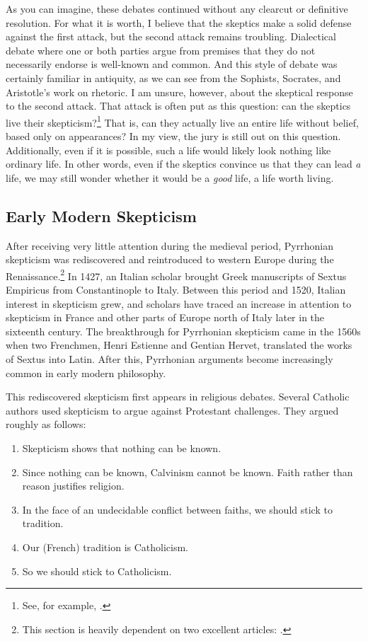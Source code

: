As you can imagine, these debates continued without any clearcut or definitive resolution. For what it is worth, I believe that the skeptics make a solid defense against the first attack, but the second attack remains troubling. Dialectical debate where one or both parties argue from premises that they do not necessarily endorse is well-known and common. And this style of debate was certainly familiar in antiquity, as we can see from the Sophists, Socrates, and Aristotle's work on rhetoric. I am unsure, however, about the skeptical response to the second attack. That attack is often put as this question: can the skeptics live their skepticism?\footnote{See, for example, \textcite{burnyeat1983a}.} That is, can they actually live an entire life without belief, based only on appearances? In my view, the jury is still out on this question. Additionally, even if it is possible, such a life would likely look nothing like ordinary life. In other words, even if the skeptics convince us that they can lead \textit{a} life, we may still wonder whether it would be a \textit{good} life, a life worth living.

\subsection*{Early Modern Skepticism}

After receiving very little attention during the medieval period, Pyrrhonian skepticism was rediscovered and reintroduced to western Europe during the Renaissance.\footnote{This section is heavily dependent on two excellent articles: \textcite{schmitt1983,popkin1993}.} In 1427, an Italian scholar brought Greek manuscripts of Sextus Empiricus from Constantinople to Italy. Between this period and 1520, Italian interest in skepticism grew, and scholars have traced an increase in attention to skepticism in France and other parts of Europe north of Italy later in the sixteenth century. The breakthrough for Pyrrhonian skepticism came in the 1560s when two Frenchmen, Henri Estienne  and Gentian Hervet, translated the works of Sextus into Latin. After this, Pyrrhonian arguments become increasingly common in early modern philosophy.

This rediscovered skepticism first appears in religious debates. Several Catholic authors used skepticism to argue against Protestant challenges. They argued roughly as follows:

\begin{enumerate}
    \item Skepticism shows that nothing can be known.
    \item Since nothing can be known, Calvinism cannot be known. Faith rather than reason justifies religion.
    \item In the face of an undecidable conflict between faiths, we should stick to tradition.
    \item Our (French) tradition is Catholicism.
    \item So we should stick to Catholicism.
\end{enumerate}

